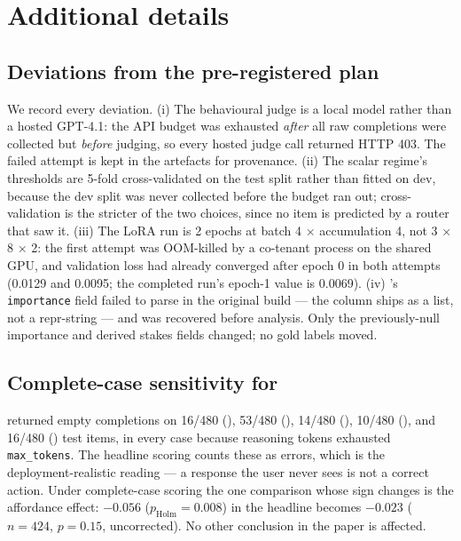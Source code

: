 \section{Additional details}
\label{app:details}

\subsection{Deviations from the pre-registered plan}
\label{app:deviations}

We record every deviation.
(i) The behavioural judge is a local \qwenjudge model rather than a hosted \textsc{GPT-4.1}: the API
budget was exhausted \emph{after} all raw completions were collected but \emph{before} judging, so
every hosted judge call returned HTTP 403. The failed attempt is kept in the artefacts for
provenance.
(ii) The scalar regime's thresholds are 5-fold cross-validated on the test split rather than fitted
on dev, because the dev split was never collected before the budget ran out; cross-validation is the
stricter of the two choices, since no item is predicted by a router that saw it.
(iii) The LoRA run is 2 epochs at batch 4 $\times$ accumulation 4, not 3 $\times$ 8 $\times$ 2: the
first attempt was OOM-killed by a co-tenant process on the shared GPU, and validation loss had
already converged after epoch 0 in both attempts (0.0129 and 0.0095; the completed run's epoch-1
value is 0.0069).
(iv) \inthree's \texttt{importance} field failed to parse in the original build --- the column ships
as a list, not a repr-string --- and was recovered before analysis. Only the previously-null
importance and derived stakes fields changed; no gold labels moved.

\subsection{Complete-case sensitivity for \gptfive}
\label{app:completecase}

\gptfive returned empty completions on 16/480 (\rzero), 53/480 (\rone), 14/480 (\rtwo), 10/480
(\rthree), and 16/480 (\rfour) test items, in every case because reasoning tokens exhausted
\texttt{max\_tokens}. The headline scoring counts these as errors, which is the deployment-realistic
reading --- a response the user never sees is not a correct action. Under complete-case scoring the
one comparison whose sign changes is the affordance effect: $-0.056$ ($p_{\text{Holm}} = 0.008$) in
the headline becomes $-0.023$ ($n = 424$, $p = 0.15$, uncorrected). No other conclusion in the paper
is affected.

